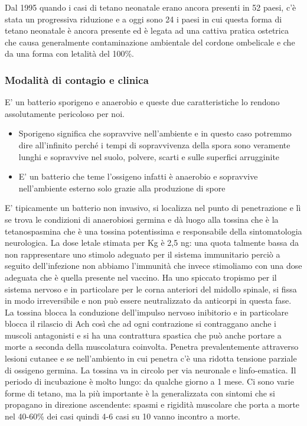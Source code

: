   Dal 1995 quando i casi di tetano neonatale erano ancora presenti in 52
  paesi, c'è stata un progressiva riduzione e a oggi sono 24 i paesi in
  cui questa forma di tetano neonatale è ancora presente ed è legata ad
  una cattiva pratica ostetrica che causa generalmente contaminazione
  ambientale del cordone ombelicale e che da una forma con letalità del
  100\%.

\subsubsection{Modalità di contagio e clinica}

  E' un batterio sporigeno e anaerobio e queste due caratteristiche lo
  rendono assolutamente pericoloso per noi.

\begin{itemize}
\item
  Sporigeno significa che sopravvive nell'ambiente e in questo caso
  potremmo dire all'infinito perché i tempi di sopravvivenza della spora
  sono veramente lunghi e sopravvive nel suolo, polvere, scarti e sulle
  superfici arrugginite
\item
  E' un batterio che teme l'ossigeno infatti è anaerobio e sopravvive
  nell'ambiente esterno solo grazie alla produzione di spore
\end{itemize}
  E' tipicamente un batterio non invasivo, si localizza nel punto di
  penetrazione e lì se trova le condizioni di anaerobiosi germina e dà
  luogo alla tossina che è la tetanospasmina che è una tossina
  potentissima e responsabile della sintomatologia neurologica. La dose
  letale stimata per Kg è 2,5 ng: una quota talmente bassa da non
  rappresentare uno stimolo adeguato per il sistema immunitario perciò a
  seguito dell'infezione non abbiamo l'immunità che invece stimoliamo
  con una dose adeguata che è quella presente nel vaccino. Ha uno
  spiccato tropismo per il sistema nervoso e in particolare per le corna
  anteriori del midollo spinale, si fissa in modo irreversibile e non
  può essere neutralizzato da anticorpi in questa fase. La tossina
  blocca la conduzione dell'impulso nervoso inibitorio e in particolare
  blocca il rilascio di Ach così che ad ogni contrazione si contraggano
  anche i muscoli antagonisti e si ha una contrattura spastica che può
  anche portare a morte a seconda della muscolatura coinvolta. Penetra
  prevalentemente attraverso lesioni cutanee e se nell'ambiento in cui
  penetra c'è una ridotta tensione parziale di ossigeno germina. La
  tossina va in circolo per via neuronale e linfo-ematica. Il periodo di
  incubazione è molto lungo: da qualche giorno a 1 mese. Ci sono varie
  forme di tetano, ma la più importante è la generalizzata con sintomi
  che si propagano in direzione ascendente: spasmi e rigidità muscolare
  che porta a morte nel 40-60\% dei casi quindi 4-6 casi su 10 vanno
  incontro a morte.

